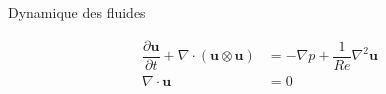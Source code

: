 \documentclass[aspectratio=169]{beamer}
\begin{document}
\begin{frame}[t, c]{Dynamique des fluides}{}
  \begin{minipage}{.48\textwidth}
    \[
    \begin{aligned}
      \dfrac{\partial \bm{u}}{\partial t} + \nabla \cdot \left( \bm{u} \otimes \bm{u} \right) & = -\nabla p + \dfrac{1}{Re} \nabla^2 \bm{u} \\
      \nabla \cdot \bm{u} & = 0
    \end{aligned}
    \]
  \end{minipage}%
  \hfill
  \begin{minipage}{.48\textwidth}
    \centering
  \end{minipage}
\end{frame}
\end{document}
